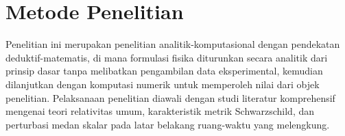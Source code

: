 \section{Metode Penelitian}

\noindent Penelitian ini merupakan penelitian analitik-komputasional dengan pendekatan 
deduktif-matematis, di mana formulasi fisika diturunkan secara analitik dari prinsip 
dasar tanpa melibatkan pengambilan data eksperimental, kemudian dilanjutkan dengan 
komputasi numerik untuk memperoleh nilai dari objek penelitian. Pelaksanaan penelitian 
diawali dengan studi literatur komprehensif mengenai teori relativitas umum, 
karakteristik metrik Schwarzschild, dan perturbasi medan skalar pada latar belakang 
ruang-waktu yang melengkung.